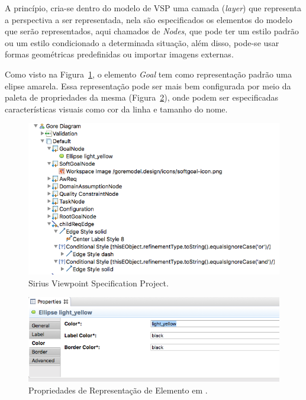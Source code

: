 A princípio, cria-se dentro do modelo de VSP uma camada (\textit{layer}) que representa a perspectiva a ser representada, nela são especificados os elementos do modelo \ecore que serão representados, aqui chamados de \textit{Nodes}, que pode ter um estilo padrão ou um estilo condicionado a determinada situação, além disso, pode-se usar formas geométricas predefinidas ou importar imagens externas. 

Como visto na Figura~\ref{exemplo-sirius-vsp}, o elemento \textit{Goal} tem como representação padrão uma elipse amarela. Essa representação pode ser mais bem configurada por meio da paleta de propriedades da mesma (Figura~\ref{figura-propriedades-personalizacao}), onde podem ser especificadas características visuais como cor da linha e tamanho do nome.

\begin{figure}
	\centering
	\includegraphics[width=1\textwidth]{figuras/unagi/exemplo-sirius-vsp.png}
	\caption{Sirius Viewpoint Specification Project.}
	\label{exemplo-sirius-vsp}
\end{figure}

\begin{figure}
	\centering
	\includegraphics[width=1\textwidth]{figuras/unagi/exemplo-propriedades-personalizacao.png}
	\caption{Propriedades de Representação de Elemento em \sirius.}
	\label{figura-propriedades-personalizacao}
\end{figure}

